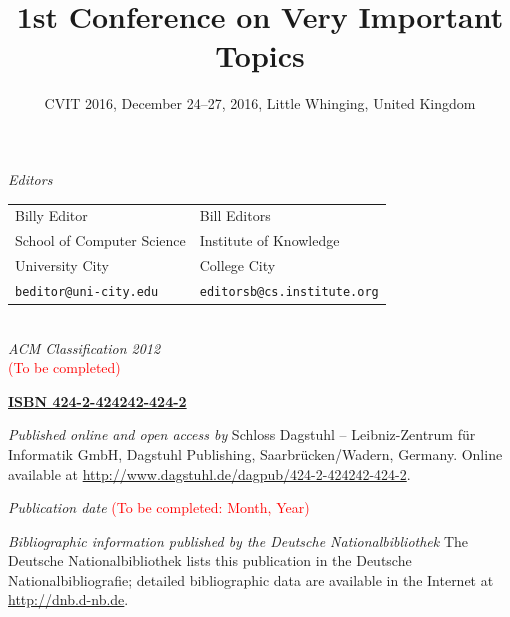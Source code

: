 \documentclass[a4paper,UKenglish]{lipicsmaster-v2018}
\title{\huge 1st Conference on Very Important Topics}
\subtitle{CVIT 2016, December 24--27, 2016, Little Whinging, United Kingdom}
\newcommand{\VolumeISBN}{424-2-424242-424-2}
\begin{document}
\frontmatter


\maketitle


\begin{publicationinfo}%
\sffamily

\emph{Editors} \\[0.2cm]
\begin{tabular}{ll}
Billy Editor              &   Bill Editors   \\
School of Computer Science   &  Institute of Knowledge \\ 
University City & College City \\ 
\texttt{beditor@uni-city.edu} &  \texttt{editorsb@cs.institute.org}
\end{tabular}
\ \\

\bigskip
\bigskip
\bigskip
\bigskip
\emph{ACM Classification 2012}\\
\textcolor{red}{(To be completed)}

\bigskip
\bigskip

{\Large\bf\sffamily \href{http://www.dagstuhl.de/dagpub/\VolumeISBN}{ISBN \VolumeISBN}}

\bigskip
\bigskip

\emph{Published online and open access by}\newline
Schloss Dagstuhl -- Leibniz-Zentrum f\"ur Informatik GmbH, Dagstuhl Publishing, Saarbr\"ucken/Wadern, Germany. Online available at \href{http://www.dagstuhl.de/dagpub/\VolumeISBN}{http://www.dagstuhl.de/dagpub/\VolumeISBN}.

\bigskip
\emph{Publication date}\newline
\textcolor{red}{(To be completed: Month, Year)}

\bigskip
\bigskip

\emph{Bibliographic information published by the Deutsche Nationalbibliothek}\newline
The Deutsche Nationalbibliothek lists this publication in the Deutsche Nationalbibliografie; detailed bibliographic data are available in the Internet at \href{http://dnb.d-nb.de}{http://dnb.d-nb.de}. 


\end{publicationinfo}
\end{document}
